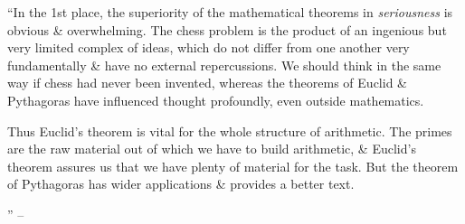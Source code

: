 \documentclass{article}
\numberwithin{equation}{section}
\begin{document}
 ``In the 1st place, the superiority of the mathematical theorems in \textit{seriousness} is obvious \& overwhelming. The chess problem is the product of an ingenious but very limited complex of ideas, which do not differ from one another very fundamentally \& have no external repercussions. We should think in the same way if chess had never been invented, whereas the theorems of Euclid \& Pythagoras have influenced thought profoundly, even outside mathematics.

Thus Euclid's theorem is vital for the whole structure of arithmetic. The primes are the raw material out of which we have to build arithmetic, \& Euclid's theorem assures us that we have plenty of material for the task. But the theorem of Pythagoras has wider applications \& provides a better text.

'' -- \cite[pp. 99--]{Hardy1992}


\printbibliography[heading=bibintoc]
	
\end{document}
